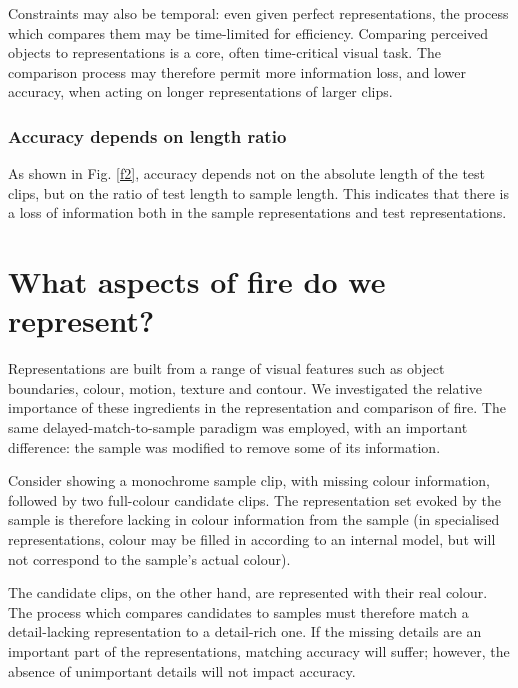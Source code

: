 \documentclass[a4paper]{article}
\begin{document}
Constraints may also be temporal: even given perfect representations, the process which compares them may be time-limited for efficiency. Comparing perceived objects to representations is a core, often time-critical visual task. The comparison process may therefore permit more information loss, and lower accuracy, when acting on longer representations of larger clips.



\subsubsection*{Accuracy depends on length ratio}

As shown in Fig. \ref{f2}, accuracy depends not on the absolute length of the test clips, but on the ratio of test length to sample length. This indicates that there is a loss of information both in the sample representations and test representations. 

\section{What aspects of fire do we represent?}

Representations are built from a range of visual features such as object boundaries, colour, motion, texture and contour. We investigated the relative importance of these ingredients in the representation and comparison of fire. The same delayed-match-to-sample paradigm was employed, with an important difference: the sample was modified to remove some of its information. 

Consider showing a monochrome sample clip, with missing colour information, followed by two full-colour candidate clips. The representation set evoked by the sample is therefore lacking in colour information from the sample (in specialised representations, colour may be filled in according to an internal model, but will not correspond to the sample's actual colour).

The candidate clips, on the other hand, are represented with their real colour. The process which compares candidates to samples must therefore match a detail-lacking representation to a detail-rich one. If the missing details are an important part of the representations, matching accuracy will suffer; however, the absence of unimportant details will not impact accuracy.
\end{document}
